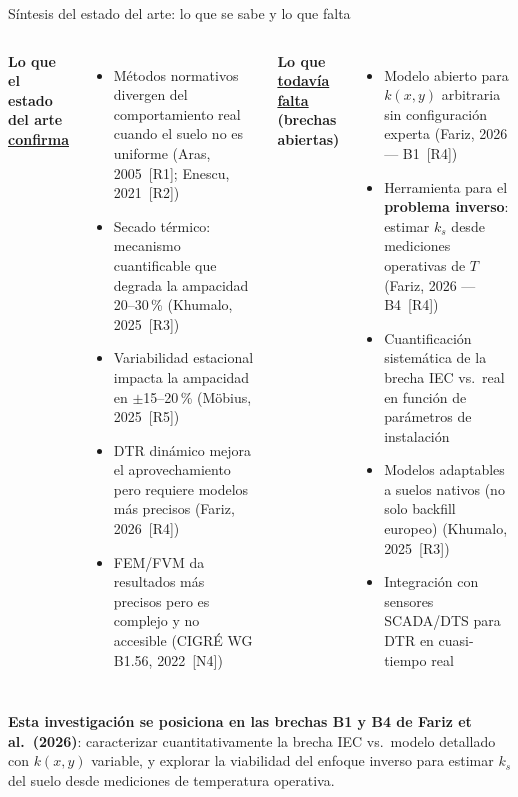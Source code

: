 \documentclass[aspectratio=169]{beamer}
\newcommand{\rcite}[1]{{\scriptsize\color{gray!70!black} #1}}
\begin{document}
\begin{frame}{Síntesis del estado del arte: lo que se sabe y lo que falta}
\begin{columns}[T]
\textbf{\small Lo que el estado del arte \underline{confirma}}\\[0.2em]
\begin{itemize}[leftmargin=*]\small
  \item[$\checkmark$] Métodos normativos divergen del comportamiento real cuando
        el suelo no es uniforme
        \rcite{(Aras, 2005~[R1]; Enescu, 2021~[R2])}
  \item[$\checkmark$] Secado térmico: mecanismo cuantificable que degrada la
        ampacidad 20--30\,\%
        \rcite{(Khumalo, 2025~[R3])}
  \item[$\checkmark$] Variabilidad estacional impacta la ampacidad en $\pm$15--20\,\%
        \rcite{(Möbius, 2025~[R5])}
  \item[$\checkmark$] DTR dinámico mejora el aprovechamiento pero requiere modelos
        más precisos
        \rcite{(Fariz, 2026~[R4])}
  \item[$\checkmark$] FEM/FVM da resultados más precisos pero es complejo y no
        accesible
        \rcite{(CIGRÉ WG B1.56, 2022~[N4])}
\end{itemize}

\textbf{\small Lo que \underline{todavía falta} (brechas abiertas)}\\[0.2em]
\begin{itemize}[leftmargin=*]\small
  \item[$\times$] Modelo abierto para $k(x,y)$ arbitraria sin
        configuración experta
        \rcite{(Fariz, 2026 --- B1~[R4])}
  \item[$\times$] Herramienta para el \textbf{problema inverso}: estimar
        $k_s$ desde mediciones operativas de $T$
        \rcite{(Fariz, 2026 --- B4~[R4])}
  \item[$\times$] Cuantificación sistemática de la brecha IEC vs.\ real
        en función de parámetros de instalación
  \item[$\times$] Modelos adaptables a suelos nativos (no solo backfill europeo)
        \rcite{(Khumalo, 2025~[R3])}
  \item[$\times$] Integración con sensores SCADA/DTS para DTR en cuasi-tiempo real
\end{itemize}
\end{columns}

\begin{exampleblock}{}
\centering\small
\textbf{Esta investigación se posiciona en las brechas B1 y B4 de Fariz et al.\
(2026)}: caracterizar cuantitativamente la brecha IEC vs.\ modelo detallado
con $k(x,y)$ variable, y explorar la viabilidad del enfoque inverso para
estimar $k_s$ del suelo desde mediciones de temperatura operativa.
\end{exampleblock}
\end{frame}
\end{document}
